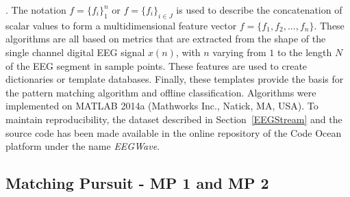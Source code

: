 \documentclass[brainsci,article,accept,moreauthors,pdftex,10pt,a4paper]{mdpi}
\begin{document}

.  The notation $f=\{f_i\}_{1}^{n} $ or $f=\{f_i\}_{i \in J}^{} $  is used to describe the concatenation of scalar values to form a multidimensional feature vector $f=\{f_1,f_2,...,f_n\}$.  These algorithms are all based on metrics that are extracted from the shape of the single channel digital EEG signal $x(n)$, with $n$ varying from $1$ to the length $N$ of the EEG segment in sample points.  These features are used to create dictionaries or template databases.  Finally, these templates provide the basis for the pattern matching algorithm and offline classification. Algorithms were implemented on MATLAB 2014a (Mathworks Inc., Natick, MA, USA).  To maintain reproducibility, the dataset described in Section~\ref{EEGStream} and the source code has been made available in the online repository of the Code Ocean platform under the name \textit{EEGWave}.%

\subsection{Matching Pursuit - MP 1 and MP 2}
\end{document}
